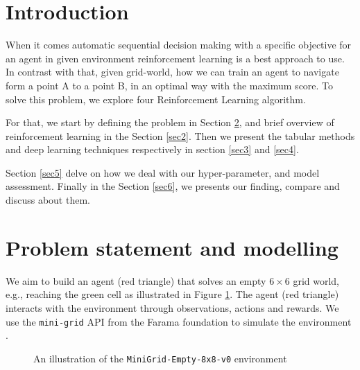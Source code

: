 \newcommand{\bydef}{\overset{\scriptscriptstyle\Delta}{=}}
\newcommand{\EE}{\mathbb{E}}
\newcommand{\PP}{\mathbb{P}}

\begin{abstract}

\end{abstract}

\section{Introduction}
When it comes automatic sequential decision making with a specific objective for an agent in given environment reinforcement learning is a best approach to use. In contrast with that, given grid-world, how we can train an agent to navigate form a point A to a point B, in an optimal way with the maximum score. To solve this problem, we explore four Reinforcement Learning algorithm.


For that, we start by defining the problem in Section \ref{sec1}, and brief overview of reinforcement learning in the Section \ref{sec2}. Then we present the tabular methods and deep learning techniques respectively in section \ref{sec3} and \ref{sec4}.

Section \ref{sec5} delve on how we deal with our hyper-parameter, and model assessment. Finally in the Section \ref{sec6}, we presents our finding, compare and discuss about them.
\section{Problem statement and modelling}\label{sec1}
We aim to build an agent (red triangle) that solves an empty  $6\times6$ grid world, e.g., reaching the green cell as illustrated in Figure \ref{fig:mini-grid}. The agent (red triangle) interacts with the environment through observations, actions and rewards. We use the \texttt{mini-grid} API from the Farama foundation to simulate the environment \cite{minigrid}.
\begin{figure}
	\centering
	\caption{An illustration of the \texttt{MiniGrid-Empty-8x8-v0} environment}
	\label{fig:mini-grid}
\end{figure}

